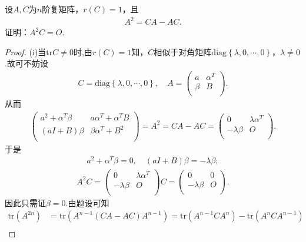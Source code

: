 \documentclass[../../main.tex]{subfiles}%
\begin{document}
\begin{example}
设$A,C$为$n$阶复矩阵，$r\left( C \right) =1$，且
\begin{align*}
A^2=CA-AC.
\end{align*}
证明：$A^2C=O$.
\end{example}
\begin{proof}
(i)当$\mathrm{tr}C\neq 0$时,由$r\left( C \right) =1$知，$C$相似于对角矩阵$\mathrm{diag}\left\{ \lambda ,0,\cdots ,0 \right\}$，$\lambda \ne 0$.故可不妨设
\begin{align*}
C=\mathrm{diag}\left\{ \lambda ,0,\cdots ,0 \right\},\quad A=\left( \begin{matrix}
a&		\alpha ^T\\
\beta&		B\\
\end{matrix} \right).
\end{align*}
从而
\begin{align*}
\left( \begin{matrix}
a^2+\alpha ^T\beta&		a\alpha ^T+\alpha ^TB\\
\left( aI+B \right) \beta&		\beta \alpha ^T+B^2\\
\end{matrix} \right) =A^2=CA-AC=\left( \begin{matrix}
0&		\lambda \alpha ^T\\
-\lambda \beta&		O\\
\end{matrix} \right).
\end{align*}
于是
\begin{align}\label{eq:::--3r90jw8fgjes0g9-j34gjdrsjg90ejrs9bjes1}
a^2+\alpha ^T\beta =0,\quad \left( aI+B \right) \beta =-\lambda \beta;
\end{align}
\begin{align*}
A^2C=\left( \begin{matrix}
0&		\lambda \alpha ^T\\
-\lambda \beta&		O\\
\end{matrix} \right) C=\left( \begin{matrix}
0&		0\\
-\lambda \beta&		O\\
\end{matrix} \right).
\end{align*}
因此只需证$\beta =0$.由题设可知
\begin{align*}
\mathrm{tr}\left( A^{2n} \right) &=\mathrm{tr}\left( A^{n-1}\left( CA-AC \right) A^{n-1} \right) =\mathrm{tr}\left( A^{n-1}CA^n \right) -\mathrm{tr}\left( A^nCA^{n-1} \right) \\

\end{align*}
\end{proof}
\end{document}
